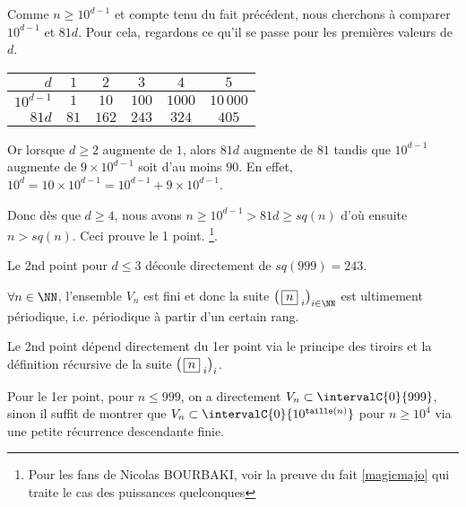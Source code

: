 \begin{proof*}
	Comme $n \geqslant 10^{d-1}$ et compte tenu du fait précédent, nous cherchons à comparer $10^{d-1}$ et $81d$.
	Pour cela, regardons ce qu'il se passe pour les premières valeurs de $d$.

	\smallskip
	\begin{center}
		\begin{tabular}{|r|c|c|c|c|c|}
			\hline
				$d$        & $1$  & $2$   & $3$   & $4$    & $5$        \\
			\hline
				$10^{d-1}$ & $1$  & $10$  & $100$ & $1000$ & $10\,000$  \\
			\hline
				$81d$      & $81$ & $162$ & $243$ & $324$  & $405$      \\
			\hline
		\end{tabular}
	\end{center}
	\smallskip
	
	Or lorsque $d \geqslant 2$ augmente de $1$, alors $81d$ augmente de $81$ tandis que $10^{d-1}$ augmente de $9\times10^{d-1}$ soit d'au moins $90$.
	En effet, $10^d = 10 \times 10^{d-1} = 10^{d-1} + 9 \times 10^{d-1}$.
	
	
	\smallskip
	
	Donc dès que $d \geqslant 4$, nous avons $n \geqslant 10^{d-1} > 81d \geqslant sq(n)$ d'où ensuite $n > sq(n)$.
	Ceci prouve le 1\ier{} point.
	\footnote{
		Pour les fans de Nicolas BOURBAKI, voir la preuve  du fait \ref{magicmajo} qui traite le cas des puissances quelconques
	}.


	\bigskip
	
	Le 2nd point pour $d \leqslant 3$ découle directement de $sq(999) = 243$.
\end{proof*}




\medskip

\begin{fact}
	$\forall n \in \NN$, l'ensemble $V_n$ est fini et donc la suite $\left( \, \sqseq{n}{i} \right)_{i \in \NN}$ est ultimement périodique, i.e. périodique à partir d'un certain rang.
\end{fact}

\begin{proof*}
	Le 2nd point dépend directement du 1er point via le principe des tiroirs et la définition récursive de la suite $\left( \, \fbox{$n$}_{\,\,i} \right)_i$.
	
	\medskip
	
	Pour le 1er point, pour $n \leqslant 999$, on a directement $V_n \subset \intervalC{0}{999}$,
	sinon il suffit de montrer que $V_n \subset \intervalC{0}{10^{\taille(n)}}$ pour $n \geqslant 10^4$ via une petite récurrence descendante finie.
\end{proof*}